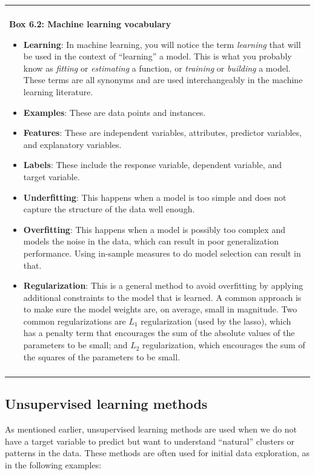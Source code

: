 \documentclass[]{krantz}
\newenvironment{F00}
    {\begin{center}
    \begin{tabular}{|p{0.9\textwidth}|}
    \hline\\
    }
    { 
    \\\\\hline
    \end{tabular} 
    \end{center}
    }
\begin{document}
\begin{F00}
\textbf{Box 6.2: Machine learning vocabulary}

\begin{itemize}
\item
  \textbf{Learning}: In machine learning, you will notice the term
  \emph{learning} that will be used in the context of ``learning'' a
  model. This is what you probably know as \emph{fitting} or
  \emph{estimating} a function, or \emph{training} or \emph{building} a
  model. These terms are all synonyms and are used interchangeably in
  the machine learning literature.
\item
  \textbf{Examples}: These are data points and instances.
\item
  \textbf{Features}: These are independent variables, attributes,
  predictor variables, and explanatory variables.
\item
  \textbf{Labels}: These include the response variable, dependent
  variable, and target variable.
\item
  \textbf{Underfitting}: This happens when a model is too simple and
  does not capture the structure of the data well enough.
\item
  \textbf{Overfitting}: This happens when a model is possibly too
  complex and models the noise in the data, which can result in poor
  generalization performance. Using in-sample measures to do model
  selection can result in that.
\item
  \textbf{Regularization}: This is a general method to avoid overfitting
  by applying additional constraints to the model that is learned. A
  common approach is to make sure the model weights are, on average,
  small in magnitude. Two common regularizations are \(L_1\)
  regularization (used by the lasso), which has a penalty term that
  encourages the sum of the absolute values of the parameters to be
  small; and \(L_2\) regularization, which encourages the sum of the
  squares of the parameters to be small.
\end{itemize}
\end{F00}

\subsection{Unsupervised learning
methods}\label{unsupervised-learning-methods}

As mentioned earlier, unsupervised learning methods are used when we do
not have a target variable to predict but want to understand ``natural''
clusters or patterns in the data. These methods are often used for
initial data exploration, as in the following examples:
\end{document}
